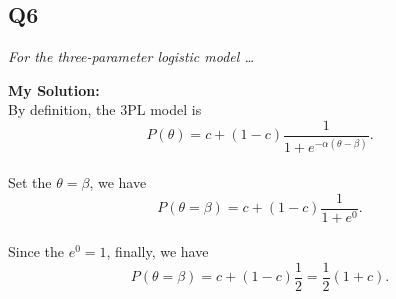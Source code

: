 \documentclass[
]{article}
\begin{document}
\hypertarget{q6}{%
\subsection{Q6}\label{q6}}

\emph{For the three-parameter logistic model \ldots{}}

\textbf{My Solution: }\\
By definition, the 3PL model is
\[P(\theta)= c+ (1-c)\frac{1}{1+e^{-\alpha(\theta-\beta)}} .\]\\
Set the \(\theta = \beta\), we have
\[P(\theta = \beta)= c+ (1-c)\frac{1}{1+e^0} .\]\\
Since the \(e^0 = 1\), finally, we have
\[P(\theta = \beta)= c+ (1-c)\frac{1}{2}=\frac{1}{2} (1+c) .\]
\end{document}
